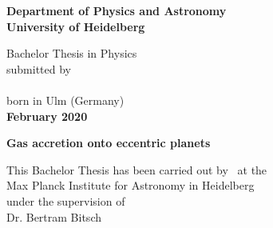 
\begin{titlepage}
  \begin{center}
     
    \Large\textbf{
      Department of Physics and Astronomy\\
      University of Heidelberg
    }
    
    \vspace{18cm}
    
    \normalsize
    Bachelor Thesis in Physics\\
    submitted by\\
    \vspace{0.5cm}
    \Large\textbf{\theauthor}\\
    \normalsize
    \vspace{0.5cm}
    born in Ulm (Germany)\\
    \vspace{0.5cm}
    \Large\textbf{February 2020}
    \normalsize
    
    \newpage\null\thispagestyle{NoHeader}\newpage
    \thispagestyle{NoHeader}
    
    \Large\textbf{
      Gas accretion onto eccentric planets
    }
    
    \vspace{18cm}
    
    \normalsize
    This Bachelor Thesis has been carried out by \theauthor\ at the\\
    Max Planck Institute for Astronomy in Heidelberg\\
    under the supervision of\\
    Dr. Bertram Bitsch
    
    \vfill
  \end{center}

\end{titlepage}

